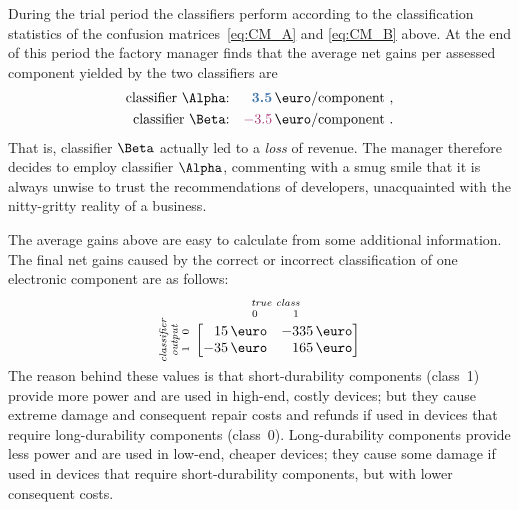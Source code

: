 \documentclass[\ifafour a4paper,12pt,\else a5paper,10pt,\fi%
onecolumn,oneside,article,%
british%
]{memoir}
\theoremstyle{remark}
\theoremstyle{innote}
\renewcommand*{\|}[1][]{\nonscript\:#1\vert\nonscript\:\mathopen{}}
\newcommand*{\good}[1]{\ensuremath{{\color{mypurpleblue}\bm{#1}}}}
\newcommand*{\bad}[1]{\ensuremath{{\color{myredpurple}#1}}}
\begin{document}
During the trial period the classifiers perform according to the classification statistics of the confusion matrices~\eqref{eq:CM_A} and \eqref{eq:CM_B} above. At the end of this period the factory manager finds that the average net gains per assessed component yielded by the two classifiers are
\begin{equation}
  \label{eq:final_gains}
\begin{aligned}
  \text{classifier $\Alpha$:}& & \good{3.5}\,\text{\texteuro/component}&\ , \\
  \text{classifier $\Beta$:}& &\bad{-3.5}\,\text{\texteuro/component}&\ .
\end{aligned}
\end{equation}
That is, classifier $\Beta$ actually led to a \emph{loss} of revenue. The manager therefore decides to employ classifier $\Alpha$, commenting with a smug smile that it is always unwise to trust the recommendations of developers, unacquainted with the nitty-gritty reality of a business.

The average gains above are easy to calculate from some additional information. The final net gains caused by the correct or incorrect classification of one electronic component are as follows:
\begin{equation}
  \label{eq:utility_example}
  \rotatebox[origin=c]{90}{
    \clap{\textit{\parbox{5em}{\centering\scriptsize classifier\\output\\$1\quad 0$}}
    }}\ 
    \overbracket[0pt]{
      \begin{bmatrix*}[r]
        15\,\text{\texteuro} & -335\,\text{\texteuro}  \\
        -35\,\text{\texteuro} & 165\,\text{\texteuro}
      \end{bmatrix*}}^{
      \clap{\textit{\parbox{6em}{\centering\scriptsize true class\\$0\hspace{3em}1$}}
    }}
\end{equation}
The reason behind these values is that short-durability components (class~1) provide more power and are used in high-end, costly devices; but they cause extreme damage and consequent repair costs and refunds if used in devices that require long-durability components (class~0). Long-durability components provide less power and are used in low-end, cheaper devices; they cause some damage if used in devices that require short-durability components, but with lower consequent costs.
\end{document}
